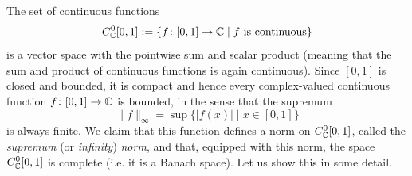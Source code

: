 \begin{example}
  The set of continuous functions
  \begin{equation}
    C^0_{\mathbb{C}}[0,1]:=\{f\colon [0,1]\to \mathbb{C} \mid f \text{ is continuous}\}
  \end{equation}
  is a vector space with the pointwise sum and scalar product (meaning
  that the sum and product of continuous functions is again continuous).
  Since $[0,1]$ is closed and bounded, it is compact and hence
  every complex-valued continuous function $f\colon [0,1]\to \mathbb{C}$ is
  bounded, in the sense that the supremum
  \begin{equation}
    \|f\|_\infty = \sup \{|f(x)|\mid x\in[0,1]\}
  \end{equation}
  is always finite.
  We claim that this function defines a norm on $C^0_{\mathbb{C}}[0,1]$,
  called the \emph{supremum} (or \emph{infinity}) \emph{norm},
  and that, equipped with this norm, the space \(C^{0}_{\mathbb{C}}[0,1]\) is
  complete (i.e. it is a Banach space).
  Let us show this in some detail.


\end{example}

